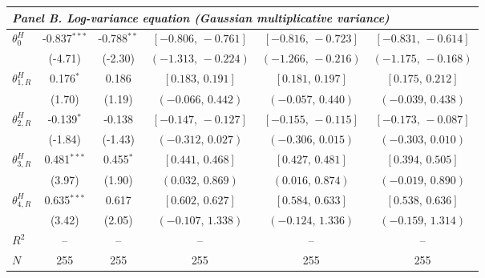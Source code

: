 \documentclass[11pt]{article}
\begin{document}
\begin{table}[!htbp]
\begin{threeparttable}
\begin{tabular}{lccccc}
\midrule
\multicolumn{6}{l}{\textit{Panel B. Log-variance equation (Gaussian multiplicative variance)}} \\
\midrule
$\theta^{H}_0$ & -0.837$^{***}$ & -0.788$^{**}$ & $[-0.806,\,-0.761]$ & $[-0.816,\,-0.723]$ & $[-0.831,\,-0.614]$ \\
 & (-4.71) & (-2.30) & $(-1.313,\,-0.224)$ & $(-1.266,\,-0.216)$ & $(-1.175,\,-0.168)$ \\
\midrule
$\theta^{H}_{1,R}$ & 0.176$^{*}$ & 0.186 & $[0.183,\,0.191]$ & $[0.181,\,0.197]$ & $[0.175,\,0.212]$ \\
 & (1.70) & (1.19) & $(-0.066,\,0.442)$ & $(-0.057,\,0.440)$ & $(-0.039,\,0.438)$ \\
$\theta^{H}_{2,R}$ & -0.139$^{*}$ & -0.138 & $[-0.147,\,-0.127]$ & $[-0.155,\,-0.115]$ & $[-0.173,\,-0.087]$ \\
 & (-1.84) & (-1.43) & $(-0.312,\,0.027)$ & $(-0.306,\,0.015)$ & $(-0.303,\,0.010)$ \\
$\theta^{H}_{3,R}$ & 0.481$^{***}$ & 0.455$^{*}$ & $[0.441,\,0.468]$ & $[0.427,\,0.481]$ & $[0.394,\,0.505]$ \\
 & (3.97) & (1.90) & $(0.032,\,0.869)$ & $(0.016,\,0.874)$ & $(-0.019,\,0.890)$ \\
$\theta^{H}_{4,R}$ & 0.635$^{***}$ & 0.617 & $[0.602,\,0.627]$ & $[0.584,\,0.633]$ & $[0.538,\,0.636]$ \\
 & (3.42) & (2.05) & $(-0.107,\,1.338)$ & $(-0.124,\,1.336)$ & $(-0.159,\,1.314)$ \\
\midrule
$R^2$ & -- & -- & -- & -- & -- \\
$N$ & 255 & 255 & 255 & 255 & 255 \\
\bottomrule
\end{tabular}
\begin{tablenotes}[flushleft]
\scriptsize

\end{tablenotes}
\end{threeparttable}
\end{table}
\end{document}
